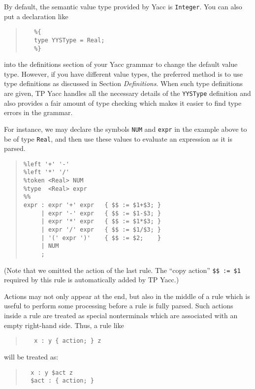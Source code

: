By default, the semantic value type provided by Yacc is \verb"Integer". You
can also put a declaration like
\begin{quote}\begin{verbatim}
   %{
   type YYSType = Real;
   %}
\end{verbatim}\end{quote}
into the definitions section of your Yacc grammar to change the default value
type. However, if you have different value types, the preferred method is to
use type definitions as discussed in Section {\em Definitions\/}. When such
type definitions are given, TP Yacc handles all the necessary details of the
\verb"YYSType" definition and also provides a fair amount of type checking
which makes it easier to find type errors in the grammar.

For instance, we may declare the symbols \verb"NUM" and \verb"expr" in the
example above to be of type \verb"Real", and then use these values to
evaluate an expression as it is parsed.

\begin{quote}\begin{verbatim}
%left '+' '-'
%left '*' '/'
%token <Real> NUM
%type  <Real> expr
%%
expr : expr '+' expr   { $$ := $1+$3; }
     | expr '-' expr   { $$ := $1-$3; }
     | expr '*' expr   { $$ := $1*$3; }
     | expr '/' expr   { $$ := $1/$3; }
     | '(' expr ')'    { $$ := $2;    }
     | NUM
     ;
\end{verbatim}\end{quote}

(Note that we omitted the action of the last rule. The ``copy action''
\verb"$$ := $1" required by this rule is automatically added by TP Yacc.)

Actions may not only appear at the end, but also in the middle of a rule
which is useful to perform some processing before a rule is fully parsed.
Such actions inside a rule are treated as special nonterminals which are
associated with an empty right-hand side. Thus, a rule like
\begin{quote}\begin{verbatim}
   x : y { action; } z
\end{verbatim}\end{quote}
will be treated as:
\begin{quote}\begin{verbatim}
  x : y $act z
  $act : { action; }
\end{verbatim}\end{quote}

